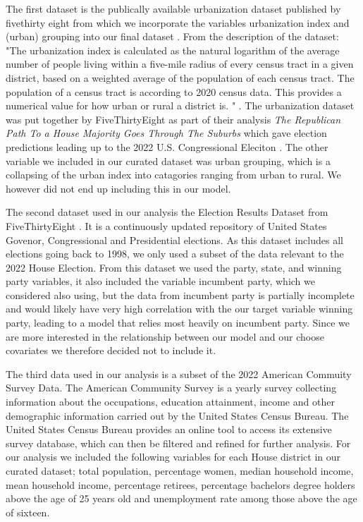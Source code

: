 \documentclass[12pt]{article}
\begin{document}
The first dataset is the publically available urbanization dataset published by fivethirty eight from which we incorporate the variables urbanization index  and (urban) grouping into our final dataset \cite{urbanizationdataset}. From the description of the dataset: "The urbanization index is calculated as the natural logarithm of the average number of people living within a five-mile radius of every census tract in a given district, based on a weighted average of the population of each census tract. The population of a census tract is according to 2020 census data. This provides a numerical value for how urban or rural a district is. " \cite{urbanizationdataset}. The urbanization dataset was put together by FiveThirtyEight as part of their analysis  \textit{The Republican Path To a House Majority Goes Through The Suburbs} which gave election predictions leading up to the 2022 U.S. Congressional Eleciton \cite{538urbanizationarticle}. The other variable we included in our curated dataset was urban grouping, which is a collapsing of the urban index into catagories ranging from urban to rural. We however did not end up including this in our model.


The second dataset used in our analysis the Election Results Dataset from FiveThirtyEight \cite{electionresultsdataset}. It is a continuously updated repository of United States Govenor, Congressional and Presidential elections. As this dataset includes all elections going back to 1998, we only used a subset of the data relevant to the 2022 House Election. From this dataset we used the party, state, and winning party variables, it also included the variable incumbent party, which we considered also using, but the data from incumbent party is partially incomplete and would likely have very high correlation with the our target variable winning party, leading to a model that relies most heavily on incumbent party. Since we are more interested in the relationship between our model and our choose covariates we therefore decided not to include it.  

The third data used in our analysis is a subset of the 2022 American Commuity Survey Data. The American Community Survey is a yearly survey collecting information about the occupations, education attainment, income and other demographic information carried out by the United States Census Bureau. The United States Census Bureau provides an online tool to access its extensive survey database, which can then be filtered and refined for further analysis. For our analysis we included the following variables for each House district in our curated dataset; total population, percentage women, median household income, mean household income, percentage retirees, percentage bachelors degree holders above the age of 25 years old and unemployment rate among those above the age of sixteen. 
\end{document}
